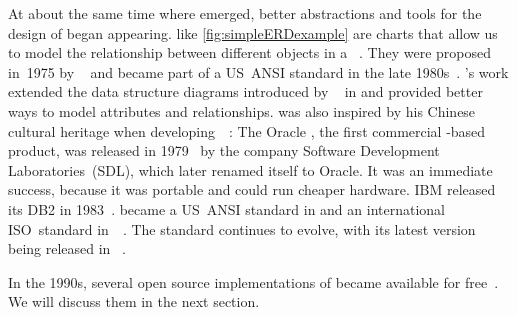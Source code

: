 At about the same time where  emerged, better abstractions and tools for the design of  began appearing.
 like \cref{fig:simpleERDexample} are charts that allow us to model the relationship between different objects in a \db~\cite{KW2012ASHOTEDAIM,C1976TERMTAUVOD}.
They were proposed in~1975 by \citeauthor{C1975TRMTAUVOD}~\cite{C1975TRMTAUVOD} and became part of a US~ANSI standard in the late 1980s~\cite{GK1985ATOOTIRDS,P1992IAX1ASFIRDSI}.
's work extended the data structure diagrams introduced by \citeauthor{B1969DSD}~\cite{B1969DSD} in \citeyear{B1969DSD} and provided better ways to model attributes and relationships.
 was also inspired by his Chinese cultural heritage when developing~~\cite{C1997ECAED,C2002ERMHEFTALL}:%
%
%
%
The Oracle , the first commercial -based product, was released in 1979~\cite{C20245YOQ} by the company Software Development Laboratories~(SDL), which later renamed itself to Oracle.
It was an immediate success, because it was portable and could run cheaper hardware.
IBM released its   DB2 in 1983~\cite{C20245YOQ,HS2013THAGOID}.
 became a US~ANSI standard in \citeyear{ANSIX3135} and an international ISO~standard in~\citeyear{ISO90751987}~\cite{ANSIX3135,ISO90751987}.
The standard continues to evolve, with its latest version being released in \citeyear{ISOIEC9707112023E}~\cite{ISOIEC9707112023E}.

In the 1990s, several open source implementations of  became available for free~\cite{C20245YOQ}.
We will discuss them in the next section.%
%
\endhsection%
%
